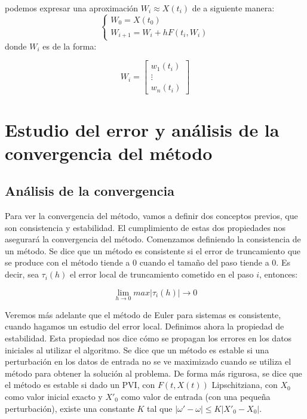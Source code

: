 \documentclass[12pt]{article}       %
\begin{document}
podemos expresar una aproximación $W_i \approx X(t_i)$ de a siguiente manera:
$$
\begin{cases}
W_0=X(t_0)\\
W_{i+1}=W_i + hF(t_i,W_i)
\end{cases}
$$
donde $W_i$ es de la forma:

\begin{equation*}
W_i=\begin{bmatrix}
w_1(t_i) \\
\vdots \\
w_n(t_i)
\end{bmatrix}
\end{equation*}

\section{Estudio del error y análisis de la convergencia del método}

\subsection{Análisis de la convergencia}

Para ver la convergencia del método, vamos a definir dos conceptos previos, que son consistencia y estabilidad. El cumplimiento de estas dos propiedades nos asegurará la convergencia del método. Comenzamos definiendo la consistencia de un método. Se dice que un método es consistente si el error de truncamiento que se produce con el método tiende a 0 cuando el tamaño del paso tiende a 0. Es decir, sea $\tau_i(h)$ el error local de truncamiento cometido en el paso $i$, entonces:

$$ \lim_{h \rightarrow 0} max | \tau_i(h) | \rightarrow 0 $$

Veremos más adelante que el método de Euler para sistemas es consistente, cuando hagamos un estudio del error local. Definimos ahora la propiedad de estabilidad. Esta propiedad nos dice cómo se propagan los errores en los datos iniciales al utilizar el algoritmo. Se dice que un método es estable si una perturbación en los datos de entrada no se ve maximizado cuando se utiliza el método para obtener la solución al problema. De forma más rigurosa, se dice que el método es estable si dado un PVI, con $F(t, X(t))$ Lipschitziana, con $X_0$ como valor inicial exacto y $X'_0$ como valor de entrada (con una pequeña perturbación), existe una constante $K$ tal que $|\omega' - \omega| \leq K|X'_0 - X_0|$.\\
\end{document}

